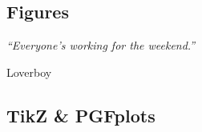 \begin{refsection}

\chapter{Figures}
\pagestyle{chapter} \label{chapter:figures}

\setlength{\epigraphwidth}{3in} 
\epigraph{\textit{``Everyone's working for the weekend.''}}{Loverboy} 
\vspace{3em} 

\section{TikZ \& PGFplots}

\clearpage
\pagestyle{biblio}
\printbibliography 

\end{refsection}